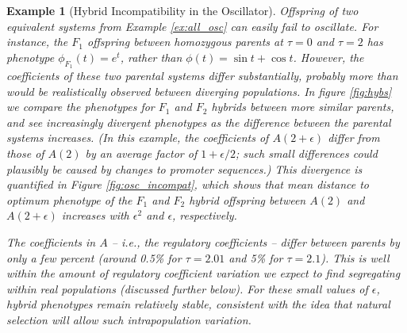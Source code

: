 \documentclass{article}
\newcommand{\1}{\mathbbm{1}}
\newcommand{\Sys}{\mathcal{S}}
\newtheorem{example}{Example}
\begin{document}
\begin{example}[Hybrid Incompatibility in the Oscillator] \label{ex:hybrid_osc}
Offspring of two equivalent systems from Example \ref{ex:all_osc}
can easily fail to oscillate.
For instance, the $F_1$ offspring between homozygous parents at $\tau=0$ and $\tau=2$
has phenotype $\phi_{F_1}(t) = e^t$, rather than $\phi(t) = \sin t + \cos t$.
However, the coefficients of these two parental systems differ substantially,
probably more than would be realistically observed between diverging populations.
In figure \ref{fig:hybs} we compare the phenotypes for $F_1$ and $F_2$ hybrids between more similar parents,
and see increasingly divergent phenotypes as the difference between the parental systems increases.
(In this example, the coefficients of $A(2+\epsilon)$ differ from those of $A(2)$ by an average factor of $1+\epsilon/2$;
such small differences could plausibly be caused by changes to promoter sequences.)
This divergence is quantified in Figure \ref{fig:osc_incompat},
which shows that mean distance to optimum phenotype of the $F_1$ and $F_2$ hybrid offspring between $A(2)$ and $A(2+\epsilon)$
increases with $\epsilon^2$ and $\epsilon$, respectively.

The coefficients in $A$ -- i.e., the regulatory coefficients --
differ between parents by only a few percent (around 0.5\% for $\tau=2.01$ and 5\% for $\tau=2.1$).
This is well within the amount of regulatory coefficient variation we expect to find segregating within real populations
(discussed further below). 
For these small values of $\epsilon$, hybrid phenotypes remain relatively stable, 
consistent with the idea that natural selection will allow such intrapopulation variation. 




\end{example}
\end{document}
